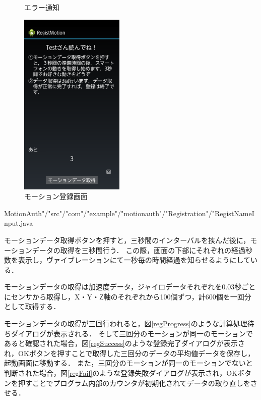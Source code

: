 \documentclass[11pt]{jreport}
\renewcommand{\slash}{"/"}
\begin{document}
\begin{figure}[htbp]
\begin{minipage}{0.33\hsize}
\begin{center}
                \end{center}
                \caption{エラー通知}
                \label{nameInputError}
            \end{minipage}
            \begin{minipage}{0.33\hsize}
                \begin{center}
                    \includegraphics[width=5cm, bb=0 0 540 960]{Reg.pdf}
                \end{center}
                \caption{モーション登録画面}
                \label{reg}
            \end{minipage}
        \end{figure}

        \newpage
        
        {MotionAuth\slash src\slash com\slash example\slash motionauth\slash Registration\slash RegistNameInput.java}
    
        モーションデータ取得ボタンを押すと，三秒間のインターバルを挟んだ後に，モーションデータの取得を三秒間行う．
        この際，画面の下部にそれぞれの経過秒数を表示し，ヴァイブレーションにて一秒毎の時間経過を知らせるようにしている．

        モーションデータの取得は加速度データ，ジャイロデータそれぞれを0.03秒ごとにセンサから取得し，X・Y・Z軸のそれぞれから100個ずつ，計600個を一回分として取得する．

        モーションデータの取得が三回行われると，図\ref{regProgress}のような計算処理待ちダイアログが表示される．
        そして三回分のモーションが同一のモーションであると確認された場合，図\ref{regSuccess}のような登録完了ダイアログが表示され，OKボタンを押すことで取得した三回分のデータの平均値データを保存し，起動画面に移動する．
        また，三回分のモーションが同一のモーションでないと判断された場合，図\ref{regFail}のような登録失敗ダイアログが表示され，OKボタンを押すことでプログラム内部のカウンタが初期化されてデータの取り直しをさせる．
\end{document}
